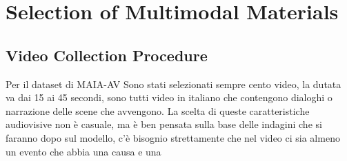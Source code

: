 \section{Selection of Multimodal Materials}
\subsection{Video Collection Procedure}
Per il dataset di MAIA-AV Sono stati selezionati sempre cento video, la dutata va dai 15 ai 45 secondi, sono tutti video in italiano che contengono dialoghi o narrazione delle scene che avvengono. La scelta di queste 
caratteristiche audiovisive non è casuale, ma è ben pensata sulla base delle indagini che si faranno dopo sul modello, c'è bisognio strettamente che nel video ci sia almeno un evento che abbia una causa e una 



















